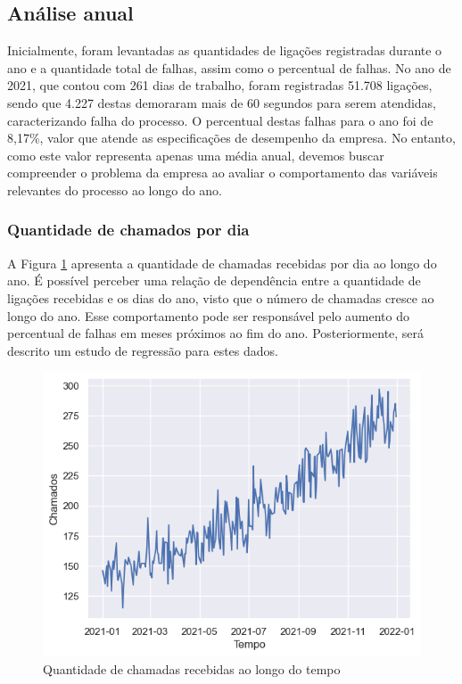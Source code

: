 \subsection{Análise anual}
Inicialmente, foram levantadas as quantidades de ligações registradas durante o ano e a quantidade total de falhas, assim como o percentual de falhas. No ano de 2021, que contou com 261 dias de trabalho, foram registradas 51.708 ligações, sendo que 4.227 destas demoraram mais de 60 segundos para serem atendidas, caracterizando falha do processo. O percentual destas falhas para o ano foi de 8,17\%, valor que atende as especificações de desempenho da empresa. No entanto, como este valor representa apenas uma média anual, devemos buscar compreender o problema da empresa ao avaliar o comportamento das variáveis relevantes do processo ao longo do ano.

\subsubsection{Quantidade de chamados por dia}
A Figura \ref*{fig: chamados-tempo} apresenta a quantidade de chamadas recebidas por dia ao longo do ano. É possível perceber uma relação de dependência entre a quantidade de ligações recebidas e os dias do ano, visto que o número de chamadas cresce ao longo do ano. Esse comportamento pode ser responsável pelo aumento do percentual de falhas em meses próximos ao fim do ano. Posteriormente, será descrito um estudo de regressão para estes dados.

\begin{figure}[ht]
    \includegraphics{analise-de-dados/anual/chamados.png}
    \caption{Quantidade de chamadas recebidas ao longo do tempo}
    \label{fig: chamados-tempo}
\end{figure}

